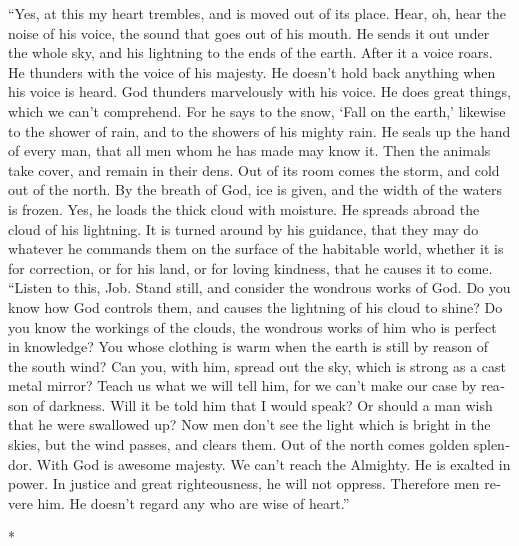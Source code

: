\begin{paracol}{2}
\begin{otherlanguage}{english}
 ``Yes, at this my heart trembles, and is moved out of its
place.  Hear, oh, hear the noise of his voice, the sound
that goes out of his mouth.  He sends it out under the
whole sky, and his lightning to the ends of the earth. 
After it a voice roars. He thunders with the voice of his majesty. He
doesn't hold back anything when his voice is heard.  God
thunders marvelously with his voice. He does great things, which we
can't comprehend.  For he says to the snow, `Fall on the
earth,' likewise to the shower of rain, and to the showers of his mighty
rain.  He seals up the hand of every man, that all men
whom he has made may know it.  Then the animals take
cover, and remain in their dens.  Out of its room comes
the storm, and cold out of the north.  By the breath of
God, ice is given, and the width of the waters is frozen.
 Yes, he loads the thick cloud with moisture. He spreads
abroad the cloud of his lightning.  It is turned around
by his guidance, that they may do whatever he commands them on the
surface of the habitable world,  whether it is for
correction, or for his land, or for loving kindness, that he causes it
to come.  ``Listen to this, Job. Stand still, and
consider the wondrous works of God.  Do you know how God
controls them, and causes the lightning of his cloud to shine?
 Do you know the workings of the clouds, the wondrous
works of him who is perfect in knowledge?  You whose
clothing is warm when the earth is still by reason of the south wind?
 Can you, with him, spread out the sky, which is strong
as a cast metal mirror?  Teach us what we will tell him,
for we can't make our case by reason of darkness.  Will
it be told him that I would speak? Or should a man wish that he were
swallowed up?  Now men don't see the light which is
bright in the skies, but the wind passes, and clears them.
 Out of the north comes golden splendor. With God is
awesome majesty.  We can't reach the Almighty. He is
exalted in power. In justice and great righteousness, he will not
oppress.  Therefore men revere him. He doesn't regard any
who are wise of heart.''

\end{otherlanguage}

\switchcolumn[0]*


\end{paracol}
